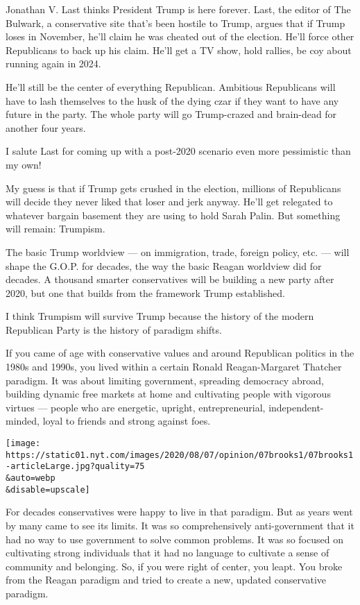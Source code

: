 Jonathan V. Last thinks President Trump is here forever. Last, the
editor of The Bulwark, a conservative site that's been hostile to Trump,
argues that if Trump loses in November, he'll claim he was cheated out
of the election. He'll force other Republicans to back up his claim.
He'll get a TV show, hold rallies, be coy about running again in 2024.

He'll still be the center of everything Republican. Ambitious
Republicans will have to lash themselves to the husk of the dying czar
if they want to have any future in the party. The whole party will go
Trump-crazed and brain-dead for another four years.

I salute Last for coming up with a post-2020 scenario even more
pessimistic than my own!

My guess is that if Trump gets crushed in the election, millions of
Republicans will decide they never liked that loser and jerk anyway.
He'll get relegated to whatever bargain basement they are using to hold
Sarah Palin. But something will remain: Trumpism.

The basic Trump worldview --- on immigration, trade, foreign policy,
etc. --- will shape the G.O.P. for decades, the way the basic Reagan
worldview did for decades. A thousand smarter conservatives will be
building a new party after 2020, but one that builds from the framework
Trump established.

I think Trumpism will survive Trump because the history of the modern
Republican Party is the history of paradigm shifts.

If you came of age with conservative values and around Republican
politics in the 1980s and 1990s, you lived within a certain Ronald
Reagan-Margaret Thatcher paradigm. It was about limiting government,
spreading democracy abroad, building dynamic free markets at home and
cultivating people with vigorous virtues --- people who are energetic,
upright, entrepreneurial, independent-minded, loyal to friends and
strong against foes.

\texttt{[image: https://static01.nyt.com/images/2020/08/07/opinion/07brooks1/07brooks1-articleLarge.jpg?quality=75\\\&auto=webp\\\&disable=upscale]}

For decades conservatives were happy to live in that paradigm. But as
years went by many came to see its limits. It was so comprehensively
anti-government that it had no way to use government to solve common
problems. It was so focused on cultivating strong individuals that it
had no language to cultivate a sense of community and belonging. So, if
you were right of center, you leapt. You broke from the Reagan paradigm
and tried to create a new, updated conservative paradigm.

